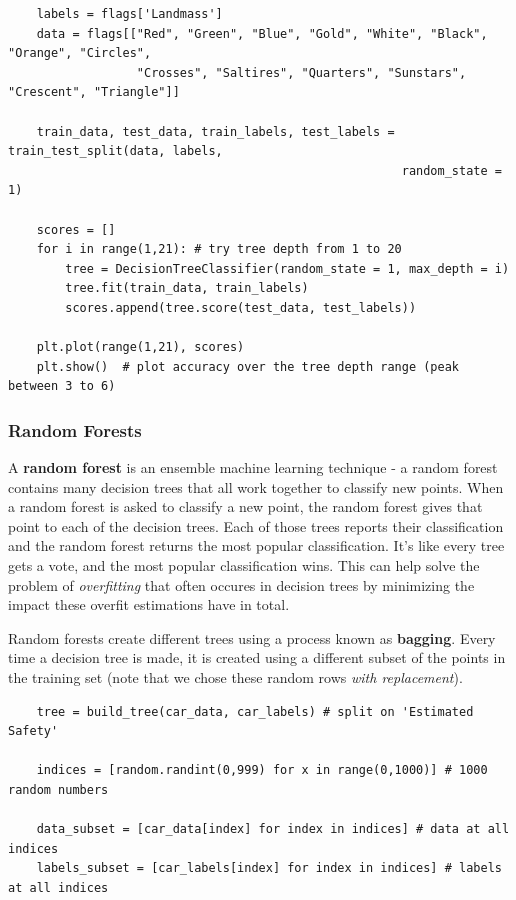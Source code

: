 \documentclass[11pt, a4paper]{article}
\begin{document}
\begin{spacing}{1.1}
\begin{lstlisting}
	labels = flags['Landmass']
	data = flags[["Red", "Green", "Blue", "Gold", "White", "Black", "Orange", "Circles", 
	              "Crosses", "Saltires", "Quarters", "Sunstars", "Crescent", "Triangle"]]
	
	train_data, test_data, train_labels, test_labels = train_test_split(data, labels, 
	                                                   random_state = 1)
	
	scores = []
	for i in range(1,21): # try tree depth from 1 to 20
		tree = DecisionTreeClassifier(random_state = 1, max_depth = i)
		tree.fit(train_data, train_labels)
		scores.append(tree.score(test_data, test_labels))
	
	plt.plot(range(1,21), scores)
	plt.show()	# plot accuracy over the tree depth range (peak between 3 to 6)\end{lstlisting} \vspace*{1mm}
	
	\subsubsection{Random Forests}
	A \textbf{random forest} is an ensemble machine learning technique - a random forest contains many decision trees that all work together to classify new points. When a random forest is asked to classify a new point, the random forest gives that point to each of the decision trees. Each of those trees reports their classification and the random forest returns the most popular classification. It’s like every tree gets a vote, and the most popular classification wins. This can help solve the problem of \textit{overfitting} that often occures in decision trees by minimizing the impact these overfit estimations have in total. \newpage

	\noindent Random forests create different trees using a process known as \textbf{bagging}. Every time a decision tree is made, it is created using a different subset of the points in the training set (note that we chose these random rows \textit{with replacement}).  
	\begin{lstlisting}
	tree = build_tree(car_data, car_labels) # split on 'Estimated Safety'
	
	indices = [random.randint(0,999) for x in range(0,1000)] # 1000 random numbers
	
	data_subset = [car_data[index] for index in indices] # data at all indices
	labels_subset = [car_labels[index] for index in indices] # labels at all indices
	

\end{lstlisting}
\end{spacing}
\end{document}
